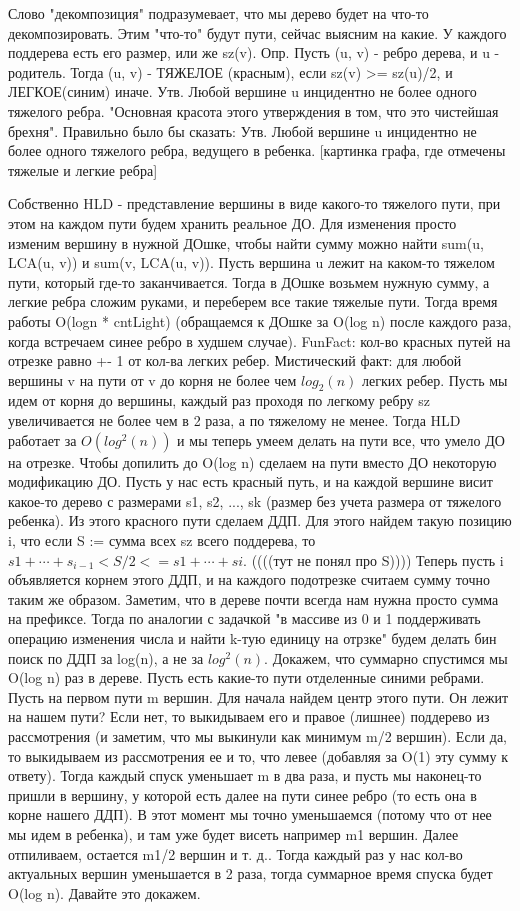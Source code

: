 Слово "декомпозиция" подразумевает, что мы дерево будет на что-то декомпозировать. Этим "что-то" будут пути, сейчас выясним на какие.
У каждого поддерева есть его размер, или же sz(v).
Опр. Пусть (u, v) - ребро дерева, и u - родитель. Тогда (u, v) - ТЯЖЕЛОЕ (красным), если sz(v) >= sz(u)/2, и ЛЕГКОЕ(синим) иначе.
Утв. Любой вершине u инцидентно не более одного тяжелого ребра. "Основная красота этого утверждения в том, что это чистейшая брехня". Правильно было бы сказать:
Утв. Любой вершине u инцидентно не более одного тяжелого ребра, ведущего в ребенка. [картинка графа, где отмечены тяжелые и легкие ребра]

Собственно HLD - представление вершины в виде какого-то тяжелого пути, при этом на каждом пути будем хранить реальное ДО. Для изменения просто изменим вершину в нужной ДОшке, чтобы найти сумму можно найти sum(u, LCA(u, v)) и sum(v, LCA(u, v)). Пусть вершина u лежит на каком-то тяжелом пути, который где-то заканчивается. Тогда в ДОшке возьмем нужную сумму, а легкие ребра сложим руками, и переберем все такие тяжелые пути. Тогда время работы O(logn * cntLight) (обращаемся к ДОшке за O(log n) после каждого раза, когда встречаем синее ребро в худшем случае). FunFact: кол-во красных путей на отрезке равно +- 1 от кол-ва легких ребер.
Мистический факт: для любой вершины v на пути от v до корня не более чем $log_2(n)$ легких ребер. Пусть мы идем от корня до вершины, каждый раз проходя по легкому ребру sz увеличивается не более чем в 2 раза, а по тяжелому не менее. 
Тогда HLD работает за $O(log^2(n))$ и мы теперь умеем делать на пути все, что умело ДО на отрезке. Чтобы допилить до O(log n) сделаем на пути вместо ДО некоторую модификацию ДО. Пусть у нас есть красный путь, и на каждой вершине висит какое-то дерево с размерами s1, s2, ..., sk (размер без учета размера от тяжелого ребенка). Из этого красного пути сделаем ДДП. Для этого найдем такую позицию i, что если S := сумма всех sz всего поддерева, то $s1 + \cdots + s_{i-1} < S/2 <= s1 + \cdots + si$. ((((тут не понял про S))))
Теперь пусть i объявляется корнем этого ДДП, и на каждого подотрезке считаем сумму точно таким же образом. Заметим, что в дереве почти всегда нам нужна просто сумма на префиксе. Тогда по аналогии с задачкой "в массиве из 0 и 1 поддерживать операцию изменения числа и найти k-тую единицу на отрзке" будем делать бин поиск по ДДП за log(n), а не за $log^2(n)$. 
Докажем, что суммарно спустимся мы O(log n) раз в дереве. Пусть есть какие-то пути отделенные синими ребрами. Пусть на первом пути m вершин. Для начала найдем центр этого пути. Он лежит на нашем пути? Если нет, то выкидываем его и правое (лишнее) поддерево из рассмотрения (и заметим, что мы выкинули как минимум m/2 вершин). Если да, то выкидываем из рассмотрения ее и то, что левее (добавляя за O(1) эту сумму к ответу). Тогда каждый спуск уменьшает m в два раза, и пусть мы наконец-то пришли в вершину, у которой есть далее на пути синее ребро (то есть она в корне нашего ДДП). В этот момент мы точно уменьшаемся (потому что от нее мы идем в ребенка), и там уже будет висеть например m1 вершин. Далее отпиливаем, остается m1/2 вершин и т. д.. Тогда каждый раз у нас кол-во актуальных вершин уменьшается в 2 раза, тогда суммарное время спуска будет O(log n). Давайте это докажем.
